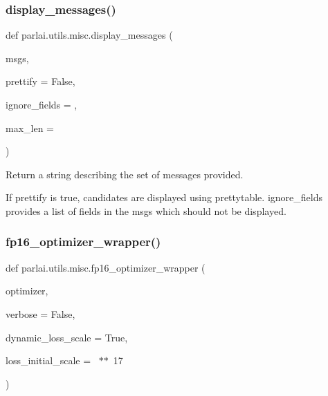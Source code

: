 \subsubsection{\texorpdfstring{display\+\_\+messages()}{display\_messages()}}
{\footnotesize\ttfamily def parlai.\+utils.\+misc.\+display\+\_\+messages (\begin{DoxyParamCaption}\item[{}]{msgs,  }\item[{}]{prettify = {\ttfamily False},  }\item[{}]{ignore\+\_\+fields = {\ttfamily \textquotesingle{}\textquotesingle{}},  }\item[{}]{max\+\_\+len = {} }\end{DoxyParamCaption})}

\begin{DoxyVerb}Return a string describing the set of messages provided.

If prettify is true, candidates are displayed using prettytable. ignore_fields
provides a list of fields in the msgs which should not be displayed.
\end{DoxyVerb}
 \mbox{\label{namespaceparlai_1_1utils_1_1misc_a7836ac7469dc5744e0ad9e5e54da2396}} 
\subsubsection{\texorpdfstring{fp16\+\_\+optimizer\+\_\+wrapper()}{fp16\_optimizer\_wrapper()}}
{\footnotesize\ttfamily def parlai.\+utils.\+misc.\+fp16\+\_\+optimizer\+\_\+wrapper (\begin{DoxyParamCaption}\item[{}]{optimizer,  }\item[{}]{verbose = {\ttfamily False},  }\item[{}]{dynamic\+\_\+loss\+\_\+scale = {\ttfamily True},  }\item[{}]{loss\+\_\+initial\+\_\+scale = {~$\ast$$\ast$~17} }\end{DoxyParamCaption})}

